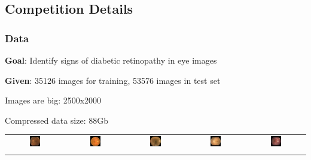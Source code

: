 \documentclass{beamer}
\begin{document}
\subsection{Competition Details}
\begin{frame}\frametitle{Data} 
\par \textbf{Goal}: Identify signs of diabetic retinopathy in eye images
\par \textbf{Given}: 35126 images for training, 53576 images in test set
\par Images are big: 2500x2000
\par Compressed data size: 88Gb

\vspace{5pt}

\begin{tabular}{|@{}c@{}|@{}c@{}|@{}c@{}|@{}c@{}|@{}c@{}|}
\hline
	\includegraphics[width=0.2\textwidth]{pics/classified_samples/197_left_0.jpg} &
	\includegraphics[width=0.2\textwidth]{pics/classified_samples/204_right_1.jpg} &
	\includegraphics[width=0.2\textwidth]{pics/classified_samples/82_right_2.jpg} &
	\includegraphics[width=0.2\textwidth]{pics/classified_samples/687_right_3.jpg} &
	\includegraphics[width=0.2\textwidth]{pics/classified_samples/2496_left_4.jpg} \\\noalign{\vspace{-0.15cm}}
\hline


\end{tabular}
\end{frame}
\end{document}
